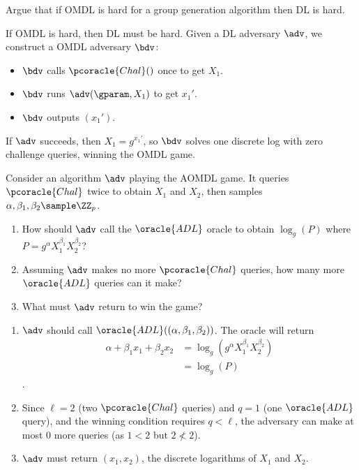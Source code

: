 \begin{exercise}
  Argue that if OMDL is hard for a group generation algorithm then DL is hard.
\end{exercise}

\ifsolutions
\begin{mysolution}
  If OMDL is hard, then DL must be hard.
  Given a \ppt DL adversary $\adv$, we construct a \ppt OMDL adversary $\bdv$:
  \begin{itemize}
    \item $\bdv$ calls $\pcoracle{Chal}()$ once to get $X_1$.
    \item $\bdv$ runs $\adv(\gparam, X_1)$ to get $x_1'$.
    \item $\bdv$ outputs $(x_1')$.
  \end{itemize}
  If $\adv$ succeeds, then $X_1 = g^{x_1'}$, so $\bdv$ solves one discrete log with zero challenge queries, winning the OMDL game.
\end{mysolution}
\fi

\begin{exercise}
  Consider an algorithm $\adv$ playing the AOMDL game. It queries $\pcoracle{Chal}$ twice to obtain $X_1$ and $X_2$, then samples $\alpha, \beta_1, \beta_2 \sample \ZZ_p$. 
  \begin{enumerate}
    \item How should $\adv$ call the $\oracle{ADL}$ oracle to obtain $\log_g(P)$ where $P = g^\alpha X_1^{\beta_1} X_2^{\beta_2}$?
    \item Assuming $\adv$ makes no more $\pcoracle{Chal}$ queries, how many more $\oracle{ADL}$ queries can it make?
    \item What must $\adv$ return to win the game?
  \end{enumerate}
\end{exercise}

\ifsolutions
\begin{mysolution}
  \begin{enumerate}
  \item $\adv$ should call $\oracle{ADL}((\alpha, \beta_1, \beta_2))$. The oracle will return
    \begin{align*}
      \alpha + \beta_1 x_1 + \beta_2 x_2 &= \log_g(g^\alpha X_1^{\beta_1} X_2^{\beta_2})\\
      &= \log_g(P)
    \end{align*}.
    \item Since $\ell = 2$ (two $\pcoracle{Chal}$ queries) and $q = 1$ (one $\oracle{ADL}$ query), and the winning condition requires $q < \ell$, the adversary can make at most 0 more queries (as $1 < 2$ but $2 \not< 2$).
    \item $\adv$ must return $(x_1, x_2)$, the discrete logarithms of $X_1$ and $X_2$.
  \end{enumerate}
\end{mysolution}
\fi

